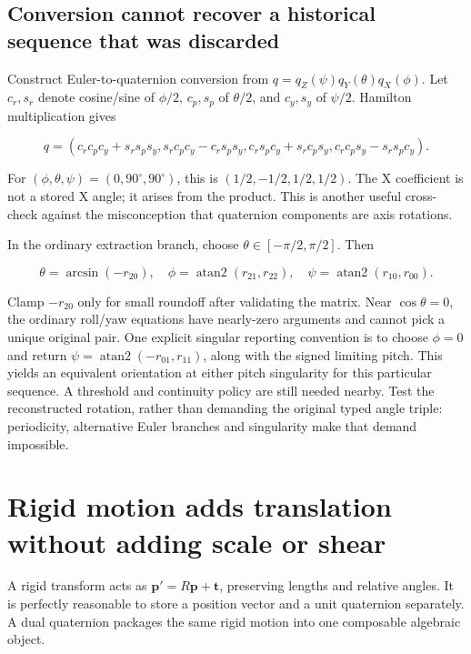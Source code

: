 \subsection{Conversion cannot recover a historical sequence that was discarded}\label{01-foundations-i-ch019-conversion-cannot-recover-a-historical-sequence-that-was-discarded}

Construct Euler-to-quaternion conversion from \(q=q_Z(\psi)q_Y(\theta)q_X(\phi)\). Let \(c_r,s_r\) denote cosine/sine of \(\phi/2\), \(c_p,s_p\) of \(\theta/2\), and \(c_y,s_y\) of \(\psi/2\). Hamilton multiplication gives

\[
q=(c_rc_pc_y+s_rs_ps_y,
s_rc_pc_y-c_rs_ps_y,
c_rs_pc_y+s_rc_ps_y,
c_rc_ps_y-s_rs_pc_y).
\]

For \((\phi,\theta,\psi)=(0,90^\circ,90^\circ)\), this is \((1/2,-1/2,1/2,1/2)\). The X coefficient is not a stored X angle; it arises from the product. This is another useful cross-check against the misconception that quaternion components are axis rotations.

In the ordinary extraction branch, choose \(\theta\in[-\pi/2,\pi/2]\). Then

\[
\theta=\arcsin(-r_{20}),\quad
\phi=\operatorname{atan2}(r_{21},r_{22}),\quad
\psi=\operatorname{atan2}(r_{10},r_{00}).
\]

Clamp \(-r_{20}\) only for small roundoff after validating the matrix. Near \(\cos\theta=0\), the ordinary roll/yaw equations have nearly-zero arguments and cannot pick a unique original pair. One explicit singular reporting convention is to choose \(\phi=0\) and return \(\psi=\operatorname{atan2}(-r_{01},r_{11})\), along with the signed limiting pitch. This yields an equivalent orientation at either pitch singularity for this particular sequence. A threshold and continuity policy are still needed nearby. Test the reconstructed rotation, rather than demanding the original typed angle triple: periodicity, alternative Euler branches and singularity make that demand impossible.

\section{Rigid motion adds translation without adding scale or shear}\label{01-foundations-i-ch019-rigid-motion-adds-translation-without-adding-scale-or-shear}

A rigid transform acts as \(\mathbf p'=R\mathbf p+\mathbf t\), preserving lengths and relative angles. It is perfectly reasonable to store a position vector and a unit quaternion separately. A dual quaternion packages the same rigid motion into one composable algebraic object.

